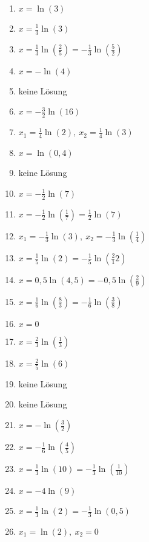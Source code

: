 \newpage
\begin{Answer}[ref=eFktGlA1]

	\begin{minipage}{\textwidth}
		\begin{minipage}{0.5\textwidth}
			\begin{enumerate}[label=\alph*)]
				\item \(x=\ln\left(3\right)\)
				\item \(x=\frac{1}{3}\ln\left(3\right)\)
				\item \(x=\frac{1}{3}\ln\left(\frac{2}{5}\right)=-\frac{1}{3}\ln\left(\frac{5}{2}\right)\)
				\item \(x=-\ln\left(4\right)\)
				\item keine Lösung
				\item \(x=-\frac{3}{2}\ln\left(16\right)\)
				\item \(x_1=\frac{1}{4}\ln\left(2\right),\ x_2=\frac{1}{4}\ln\left(3\right)\)
				\item \(x=\ln\left(0,4\right)\)
				\item keine Lösung
				\item \(x=-\frac{1}{2}\ln\left(7\right)\)
				\item \(x=-\frac{1}{2}\ln\left(\frac{1}{7}\right)=\frac{1}{2}\ln\left(7\right)\)
				\item \(x_1=-\frac{1}{3}\ln\left(3\right),\ x_2=-\frac{1}{3}\ln\left(\frac{1}{4}\right)\)
				\item \(x=\frac{1}{5}\ln\left(2\right)=-\frac{1}{5}\ln\left(\frac{2}{1}2\right)\)
			\end{enumerate}
		\end{minipage}%
		\begin{minipage}{0.5\textwidth}
			\begin{enumerate}[label=\alph*)]
				\setcounter{enumi}{13}
				\item \(x=0,5\ln\left(4,5\right)=-0,5\ln\left(\frac{2}{9}\right)\)
				\item \(x=\frac{1}{6}\ln\left(\frac{8}{3}\right)=-\frac{1}{6}\ln\left(\frac{3}{8}\right)\)
				\item \(x=0\)
				\item \(x=\frac{2}{3}\ln\left(\frac{1}{3}\right)\)
				\item \(x=\frac{2}{5}\ln\left(6\right)\)
				\item keine Lösung
				\item keine Lösung
				\item \(x=-\ln\left(\frac{3}{2}\right)\)
				\item \(x=-\frac{1}{6}\ln\left(\frac{4}{5}\right)\)
				\item \(x=\frac{1}{3}\ln\left(10\right)=-\frac{1}{3}\ln\left(\frac{1}{10}\right)\)
				\item \(x=-4\ln\left(9\right)\)
				\item \(x=\frac{1}{3}\ln\left(2\right)=-\frac{1}{3}\ln\left(0,5\right)\)
				\item \(x_1=\ln\left(2\right),\ x_2=0\)
			\end{enumerate}
		\end{minipage}%
	\end{minipage}
\end{Answer}